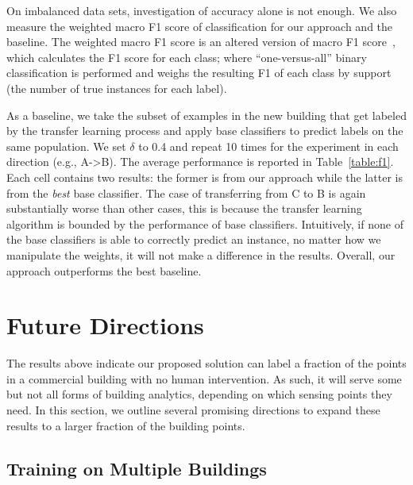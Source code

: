 On imbalanced data sets, investigation of accuracy alone is not enough. We also measure the weighted macro F1 score of
classification for our approach and the baseline. The weighted macro F1 score is an altered version of macro F1 score~\cite{yang},
which calculates the F1 score for each class; where ``one-versus-all'' binary classification is performed and weighs the resulting F1 of each class by support (the number of true instances for each label).

As a baseline, we take the subset of examples in the new building that get labeled by the transfer learning process and apply base classifiers to predict labels on the same population.
We set $\delta$ to 0.4 and
repeat 10 times for the experiment in each direction (e.g., A->B). The average performance is reported in Table~\ref{table:f1}.
Each cell contains two results: the former is from our approach while the latter is from the {\it best} base classifier.
The case of transferring from C to B is again substantially worse than other cases, this is because the transfer learning algorithm is bounded by the performance of base classifiers.
Intuitively, if none of the base classifiers is able to correctly predict an instance, no matter how we manipulate the weights, it will not make a difference in the results.
Overall, our approach outperforms the best baseline.


\section{Future Directions}

The results above indicate our proposed solution can label a fraction of
the points in a commercial building with no human intervention. As
such, it will serve some but not all forms of building analytics,
depending on which sensing points they need. In this section, we
outline several promising directions to expand these results to a
larger fraction of the building points.

\subsection{Training on Multiple Buildings}


